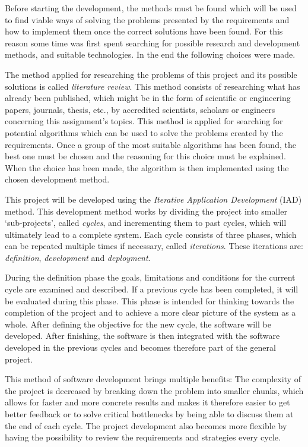 
Before starting the development, the methods must be found which will be used to find viable ways of solving the problems presented by the requirements and how to implement them once the correct solutions have been found. For this reason some time was first spent searching for possible research and development methods, and suitable technologies. In the end the following choices were made.


The method applied for researching the problems of this project and its possible solutions is called \emph{literature review}. This method consists of researching what has already been published, which might be in the form of scientific or engineering papers, journals, thesis, etc., by accredited scientists, scholars or engineers concerning this assignment's topics. 
This method is applied for searching for potential algorithms which can be used to solve the problems created by the requirements. Once a group of the most suitable algorithms has been found, the best one must be chosen and the reasoning for this choice must be explained. When the choice has been made, the algorithm is then implemented using the chosen development method.


This project will be developed using the \emph{Iterative Application Development} (IAD) method. This development method works by dividing the project into smaller `sub-projects', called \emph{cycles}, and incrementing them to past cycles, which will ultimately lead to a complete system. Each cycle consists of three phases, which can be repeated multiple times if necessary, called \emph{iterations}. These iterations are: \emph{definition}, \emph{development} and \emph{deployment}.

During the definition phase the goals, limitations and conditions for the current cycle are examined and described. If a previous cycle has been completed, it will be evaluated during this phase. This phase is intended for thinking towards the completion of the project and to achieve a more clear picture of the system as a whole.
After defining the objective for the new cycle, the software will be developed. After finishing, the software is then integrated with the software developed in the previous cycles and becomes therefore part of the general project.

This method of software development brings multiple benefits: The complexity of the project is decreased by breaking down the problem into smaller chunks, which allows for faster and more concrete results and makes it therefore easier to get better feedback or to solve critical bottlenecks by being able to discuss them at the end of each cycle. The project development also becomes more flexible by having the possibility to review the requirements and strategies every cycle.

